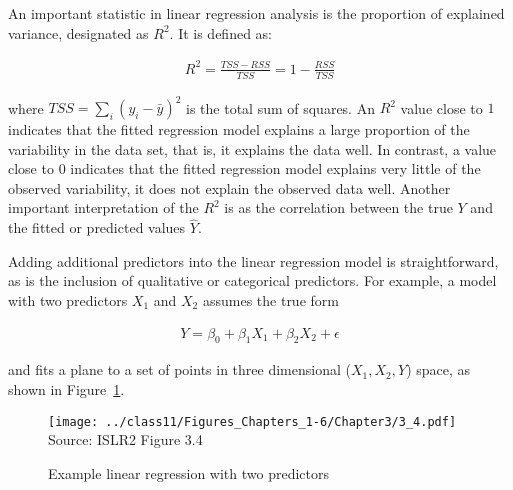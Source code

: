
An important statistic in linear regression analysis is the proportion of explained variance, designated as $R^2$. It is defined as:

\begin{align*}
R^2 = \frac{TSS - RSS}{TSS} = 1 - \frac{RSS}{TSS}
\end{align*}

\noindent where $TSS = \sum_i(y_i - \bar{y})^2$ is the total sum of squares. An $R^2$ value close to $1$ indicates that the fitted regression model explains a large proportion of the variability in the data set, that is, it explains the data well. In contrast, a value close to $0$ indicates that the fitted regression model explains very little of the observed variability, it does not explain the observed data well. Another important interpretation of the $R^2$ is as the correlation between the true $Y$ and the fitted or predicted values $\hat{Y}$.

Adding additional predictors into the linear regression model is straightforward, as is the inclusion of qualitative or categorical predictors. For example, a model with two predictors $X_1$ and $X_2$ assumes the true form

\begin{align*}
Y = \beta_0 + \beta_1 X_1 + \beta_2 X_2 + \epsilon
\end{align*}

\noindent and fits a plane to a set of points in three dimensional ($X_1, X_2, Y$) space, as shown in Figure~\ref{fig:plane}. 

\begin{figure}
\centering
\texttt{[image: ../class11/Figures\_Chapters\_1-6/Chapter3/3\_4.pdf]}  \\

\scriptsize Source: ISLR2 Figure 3.4
\caption{Example linear regression with two predictors}
\label{fig:plane}
\end{figure}


